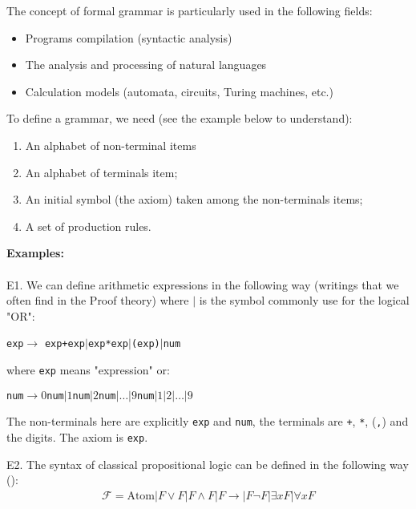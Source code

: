 	The concept of formal grammar is particularly used in the following fields:
	\begin{itemize}
		\item Programs compilation (syntactic analysis)

		\item The analysis and processing of natural languages

		\item Calculation models (automata, circuits, Turing machines, etc.)
	\end{itemize}
	To define a grammar, we need (see the example below to understand):
	\begin{enumerate}
		\item An alphabet of non-terminal items

		\item An alphabet of terminals item;

		\item An initial symbol (the axiom) taken among the non-terminals items;

		\item A set of production rules.
	\end{enumerate}
	\begin{tcolorbox}[colframe=black,colback=white,sharp corners]
	\textbf{{\Large {}}Examples:}\\\\
	E1. We can define arithmetic expressions in the following way (writings that we often find in the Proof theory) where $|$ is the symbol commonly use for the logical "OR":
	\begin{center}
		\texttt{exp}$\rightarrow$ \texttt{exp+exp}$|$\texttt{exp*exp}$|$\texttt{(exp)}$|$\texttt{num}
	\end{center}
	where \texttt{exp} means "expression" or:
	\begin{center}
		\texttt{num}$\rightarrow 0$\texttt{num}$|1$\texttt{num}$|2$\texttt{num}$|\ldots|9$\texttt{num}$|1|2|\ldots|9$
	\end{center}
	The non-terminals here are explicitly \texttt{exp} and \texttt{num}, the terminals are \texttt{+}, \texttt{*}, (\texttt{,}) and the digits. The axiom is \texttt{exp}.
	
	E2. The syntax of classical propositional logic can be defined in the following way ():
	\begin{gather*}
		\mathcal{F}=\text{Atom}|F\vee F|F\wedge F|F\rightarrow|F\neg F|\exists x F|\forall xF
	\end{gather*}
	\end{tcolorbox}
